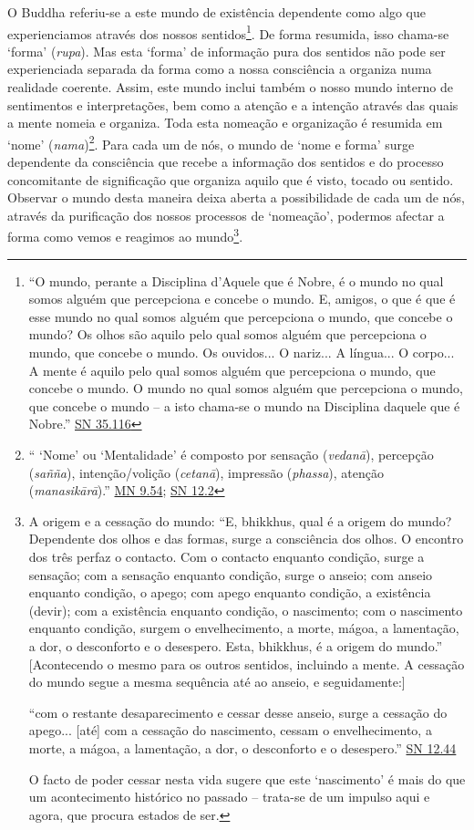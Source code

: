 O Buddha referiu-se a este mundo de existência dependente como algo que experienciamos através dos nossos sentidos\footnote{``O mundo, perante a Disciplina d'Aquele que é Nobre, é o mundo no qual somos alguém que percepciona e concebe o mundo. E, amigos, o que é que é esse mundo no qual somos alguém que percepciona o mundo, que concebe o mundo? Os olhos são aquilo pelo qual somos alguém que percepciona o mundo, que concebe o mundo. Os ouvidos... O nariz... A língua... O corpo... A mente é aquilo pelo qual somos alguém que percepciona o mundo, que concebe o mundo. O mundo no qual somos alguém que percepciona o mundo, que concebe o mundo -- a isto chama-se o mundo na Disciplina daquele que é Nobre.'' \href{https://suttacentral.net/sn35.116/en/bodhi}{SN 35.116}}. De forma resumida, isso chama-se `forma' (\emph{rupa}). Mas esta `forma' de informação pura dos sentidos não pode ser experienciada separada da forma como a nossa consciência a organiza numa realidade coerente. Assim, este mundo inclui também o nosso mundo interno de sentimentos e interpretações, bem como a atenção e a intenção através das quais a mente nomeia e organiza. Toda esta nomeação e organização é resumida em `nome' (\emph{nama})\footnote{`` `Nome' ou `Mentalidade' é composto por sensação (\emph{vedanā}), percepção (\emph{sañña}), intenção/volição (\emph{cetanā}), impressão (\emph{phassa}), atenção (\emph{manasikārā}).'' \href{https://suttacentral.net/mn9/en/bodhi}{MN 9.54}; \href{https://suttacentral.net/sn12.2/en/bodhi}{SN 12.2}}. Para cada um de nós, o mundo de `nome e forma' surge dependente da consciência que recebe a informação dos sentidos e do processo concomitante de significação que organiza aquilo que é visto, tocado ou sentido. Observar o mundo desta maneira deixa aberta a possibilidade de cada um de nós, através da purificação dos nossos processos de `nomeação', podermos afectar a forma como vemos e reagimos ao mundo\footnote{A origem e a cessação do mundo: ``E, bhikkhus, qual é a origem do mundo? Dependente dos olhos e das formas, surge a consciência dos olhos. O encontro dos três perfaz o contacto. Com o contacto enquanto condição, surge a sensação; com a sensação enquanto condição, surge o anseio; com anseio enquanto condição, o apego; com apego enquanto condição, a existência (devir); com a existência enquanto condição, o nascimento; com o nascimento enquanto condição, surgem o envelhecimento, a morte, mágoa, a lamentação, a dor, o desconforto e o desespero. Esta, bhikkhus, é a origem do mundo.'' {[}Acontecendo o mesmo para os outros sentidos, incluindo a mente. A cessação do mundo segue a mesma sequência até ao anseio, e seguidamente:{]}

  ``com o restante desaparecimento e cessar desse anseio, surge a cessação do apego... {[}até{]} com a cessação do nascimento, cessam o envelhecimento, a morte, a mágoa, a lamentação, a dor, o desconforto e o desespero.'' \href{https://suttacentral.net/sn12.44/en/bodhi}{SN 12.44}

  O facto de poder cessar nesta vida sugere que este `nascimento' é mais do que um acontecimento histórico no passado -- trata-se de um impulso aqui e agora, que procura estados de ser.}.

